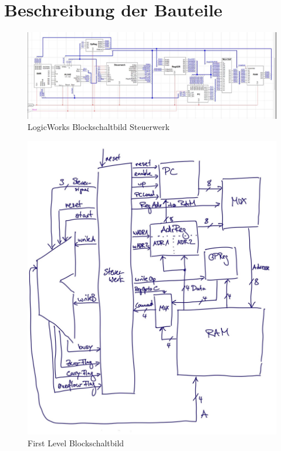 \chapter{Beschreibung der Bauteile}
\label{chap:beschreibung_der_bauteile}

\begin{figure}[ht]
    \centering
    \includegraphics[scale=0.2]
    {content/figures/blockschaltbild-steuerwerk.jpg}
    \caption{LogicWorks Blockschaltbild Steuerwerk}
    \label{fig:lw-bsb-steuerwerk}
\end{figure}


\begin{figure}[ht]
    \centering
    \includegraphics[scale=0.3]
    {content/figures/BSB_SW.jpg}
    \caption{First Level Blockschaltbild}
    \label{fig:blockschaltbild-first-level}
\end{figure}

